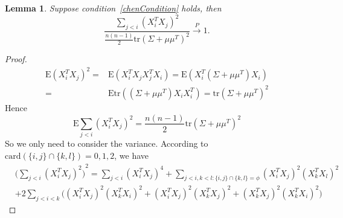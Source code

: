 \documentclass[review]{elsarticle}
\theoremstyle{plain}
\newtheorem{lemma}{Lemma}
\theoremstyle{definition}
\theoremstyle{remark}
\begin{document}
\begin{lemma}\label{ratioLemma}
    Suppose condition~\eqref{chenCondition} holds, then
    \begin{equation}
        \frac{\sum_{j<i}{(X_i^T X_j)}^2}{\frac{n(n-1)}{2}\mathrm{tr} (\Sigma+\mu\mu^T)^2}
        \xrightarrow{P}1.
    \end{equation}
\end{lemma}
\begin{proof}
    \begin{equation}
        \begin{aligned}
            \mathrm{E}{(X_i^T X_j)}^2=&
            \mathrm{E}(X_i^T X_j X_j^T X_i)=
            \mathrm{E}(X_i^T (\Sigma+\mu \mu^T) X_i)\\
            =&
            \mathrm{E}\mathrm{tr}((\Sigma+\mu \mu^T) X_i X_i^T)=\mathrm{tr}{(\Sigma+\mu \mu^T)}^2
        \end{aligned}
    \end{equation}
    Hence
    \begin{equation}
        \mathrm{E}\sum_{j<i}{(X_i^T X_j)}^2=\frac{n(n-1)}{2}\mathrm{tr}{(\Sigma+\mu\mu^T)}^2
    \end{equation}
    So we only need to consider the variance. According to $\mathrm{card}(\{i,j\}\cap\{k,l\})=0,1,2$, we have
    \begin{equation}\label{eq:1}
    \begin{aligned}
        &{\big(\sum_{j<i}{(X_i^T X_j)}^2\big)}^2
        =
        \sum_{j<i}{(X_i^T X_j)}^4+
        \sum_{j<i,k<l:\{i,j\}\cap \{k,l\}=\phi}{(X_i^T X_j)}^2{(X_k^T X_l)}^2\\
        &+2\sum_{j<i<k}\big(
        {(X_i^T X_j)}^2{(X_k^T X_i)}^2+
{(X_i^T X_j)}^2{(X_k^T X_j)}^2+
{(X_k^T X_j)}^2{(X_k^T X_i)}^2
        \big)
    \end{aligned}
    \end{equation}



\end{proof}
\end{document}
